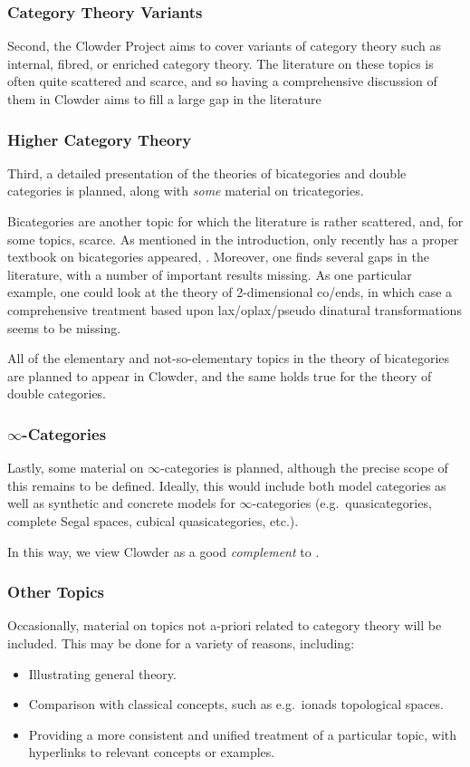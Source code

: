 \subsubsection{Category Theory Variants}\label{subsubsection-category-theory-variants}
Second, the Clowder Project aims to cover variants of category theory such as internal, fibred, or enriched category theory. The literature on these topics is often quite scattered and scarce, and so having a comprehensive discussion of them in Clowder aims to fill a large gap in the literature
\subsubsection{Higher Category Theory}\label{subsubsection-higher-category-theory}
Third, a detailed presentation of the theories of bicategories and double categories is planned, along with \emph{some} material on tricategories.

Bicategories are another topic for which the literature is rather scattered, and, for some topics, scarce. As mentioned in the introduction, only recently has a proper textbook on bicategories appeared, \cite{2-categories-book}. Moreover, one finds several gaps in the literature, with a number of important results missing. As one particular example, one could look at the theory of 2-dimensional co/ends, in which case a comprehensive treatment based upon lax/oplax/pseudo dinatural transformations seems to be missing.

All of the elementary and not-so-elementary topics in the theory of bicategories are planned to appear in Clowder, and the same holds true for the theory of double categories.
\subsubsection{$\infty$-Categories}\label{susbsection-infty-categories}
Lastly, some material on $\infty$-categories is planned, although the precise scope of this remains to be defined. Ideally, this would include both model categories as well as synthetic and concrete models for $\infty$-categories (e.g.\ quasicategories, complete Segal spaces, cubical quasicategories, etc.).

In this way, we view Clowder as a good \emph{complement} to \cite{kerodon}.
\subsubsection{Other Topics}\label{subsubsection-other-topics}
Occasionally, material on topics not a-priori related to category theory will be included. This may be done for a variety of reasons, including:
\begin{itemize}
    \item Illustrating general theory.
    \item Comparison with classical concepts, such as e.g.\ ionads \vs topological spaces.
    \item Providing a more consistent and unified treatment of a particular topic, with hyperlinks to relevant concepts or examples.
\end{itemize}
